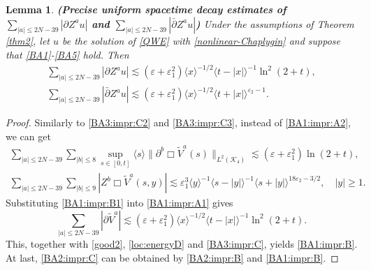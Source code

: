 \documentclass[11pt,twoside]{article}
\def\cK{\mathcal K}
\def\ds{\displaystyle}
\def\p{\partial}
\def\ve{\varepsilon}
\def\ls{\lesssim}
\newcommand{\w}[1]{\langle {#1} \rangle}
\theoremstyle{plain}
\newtheorem{lemma}[theorem]{Lemma}
\theoremstyle{definition}
\numberwithin{equation}{section}
\begin{document}
\begin{lemma}
{\bf (Precise uniform spacetime decay estimates of $\ds\sum_{|a|\le2N-39}|\p Z^au|$ and $\ds\sum_{|a|\le2N-39}|\bar\p Z^au|$)}
Under the assumptions of Theorem \ref{thm2}, let $u$ be the solution of \eqref{QWE} with \eqref{nonlinear-Chaplygin}
and suppose that \eqref{BA1}-\eqref{BA5} hold. Then 
\begin{align}
\sum_{|a|\le2N-39}|\p Z^au|\ls(\ve+\ve_1^2)\w{x}^{-1/2}\w{t-|x|}^{-1}\ln^2(2+t),\label{BA1:impr:B}\\
\sum_{|a|\le2N-39}|\bar\p Z^au|\ls(\ve+\ve_1^2)\w{x}^{-1/2}\w{t+|x|}^{\ve_2-1}.\label{BA2:impr:C}
\end{align}
\end{lemma}
\begin{proof}
Similarly to \eqref{BA3:impr:C2} and \eqref{BA3:impr:C3}, instead of \eqref{BA1:impr:A2}, we can get
\begin{equation}\label{BA1:impr:B1}
\begin{split}
\sum_{|a|\le2N-39}\sum_{|b|\le8}\sup_{s\in[0,t]}\w{s}\|\p^b\Box\tilde V^a(s)\|_{L^2(\cK_4)}\ls(\ve+\ve_1^2)\ln(2+t),\\
\sum_{|a|\le2N-39}\sum_{|b|\le9}|Z^b\Box \tilde V^a(s,y)|\ls\ve_1^3\w{y}^{-1}\w{s-|y|}^{-1}\w{s+|y|}^{18\ve_2-3/2},\quad |y|\ge1.
\end{split}
\end{equation}
Substituting \eqref{BA1:impr:B1} into \eqref{BA1:impr:A1} gives
\begin{equation*}
\sum_{|a|\le2N-39}|\p\tilde V^a|\ls(\ve+\ve_1^2)\w{x}^{-1/2}\w{t-|x|}^{-1}\ln^2(2+t).
\end{equation*}
This, together with \eqref{good2}, \eqref{loc:energyD} and \eqref{BA3:impr:C}, yields \eqref{BA1:impr:B}.
At last, \eqref{BA2:impr:C} can be obtained by \eqref{BA2:impr:B} and \eqref{BA1:impr:B}.
\end{proof}
\end{document}

